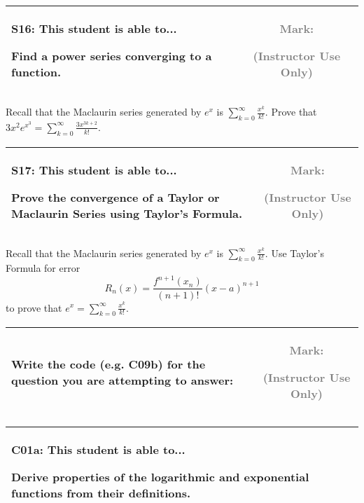 \documentclass[12pt]{article}
\newcommand{\standardQuestion}[2]{
\newpage
\begin{center}
  \begin{tabular}{|l|c|}
  \hline
    \parbox{5in}{
      \textbf{#1}: This student is able to...\\
      #2
    }
  &
    \parbox{1in}{
      \vspace{0.1in}
      \footnotesize \textcolor{gray}{Mark:}
      \vspace{0.7in}

      \tiny \textcolor{gray}{(Instructor Use Only)}
    }
  \\\hline
  \end{tabular}
\end{center}
}
\begin{document}
\standardQuestion{S16}{
  Find a power series converging to a function.
}

Recall that the Maclaurin series generated by \(e^x\) is
\(\sum_{k=0}^\infty\frac{x^k}{k!}\). Prove that
\(3x^2e^{x^3}=\sum_{k=0}^\infty\frac{3x^{3k+2}}{k!}\).


\standardQuestion{S17}{
  Prove the convergence of a Taylor or Maclaurin Series using Taylor’s Formula.
}

Recall that the Maclaurin series generated by \(e^x\) is
\(\sum_{k=0}^\infty\frac{x^k}{k!}\).
Use Taylor's Formula
for error \[R_n(x)=\frac{f^{n+1}(x_n)}{(n+1)!}(x-a)^{n+1}\]
to prove that
\(e^x=\sum_{k=0}^\infty\frac{x^k}{k!}\).


\newcommand{\blankStandardQuestion}{
\newpage
\begin{center}
  \begin{tabular}{|l|c|}
  \hline
    \parbox{5in}{
      \textbf{Write the code (e.g. C09b) for the question you are attempting
      to answer:}
      \vspace{0.6in}
    }
  &
    \parbox{1in}{
      \vspace{0.1in}
      \footnotesize \textcolor{gray}{Mark:}
      \vspace{0.7in}

      \tiny \textcolor{gray}{(Instructor Use Only)}
    }
  \\\hline
  \end{tabular}
\end{center}
}

\blankStandardQuestion

\newpage


\newcommand{\standardQuestionOption}[2]{
\begin{center}
  \begin{tabular}{|lc|}
  \hline
    \parbox{6in}{
      \vspace{0.1in}

      \textbf{#1}: This student is able to...\\
      #2

      \vspace{0.1in}
    }
  &
  \\\hline
  \end{tabular}
\end{center}
}



\standardQuestionOption{C01a}{
  Derive properties of the logarithmic and exponential functions from their definitions.
}
\end{document}
